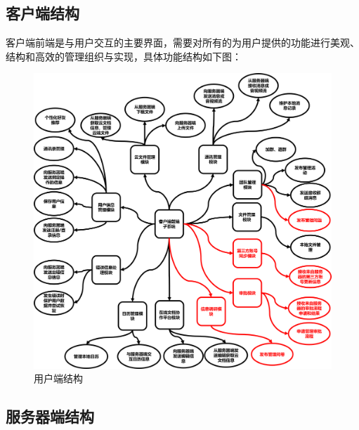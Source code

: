     \subsection{\color{red}客户端结构}
        客户端前端是与用户交互的主要界面，需要对所有的为用户提供的功能进行美观、
        结构和高效的管理组织与实现，具体功能结构如下图：
        \newpage
        \begin{figure}[h]
            \centering
            \includegraphics[scale=0.25]{OutlineDesign/figures/用户端结构new.png}
            \caption{\color{red}用户端结构}
            \label{fig:server_flow}
        \end{figure}
\subsection{\color{red}服务器端结构}
    
